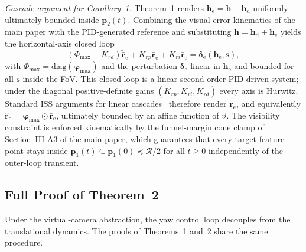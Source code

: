 \documentclass[10pt,journal]{IEEEtran}
\begin{document}
\textit{Cascade argument for Corollary~1.} Theorem~1 renders $\boldsymbol{h}_\text{e}=\boldsymbol{h}-\boldsymbol{h}_\text{d}$ uniformly ultimately bounded inside $\boldsymbol{p}_2(t)$. Combining the visual error kinematics of the main paper with the PID-generated reference and substituting $\boldsymbol{h}=\boldsymbol{h}_\text{d}+\boldsymbol{h}_\text{e}$ yields the horizontal-axis closed loop
\begin{equation*}
    (\Phi_\text{max}+K_{rd})\ddot{\bar{\boldsymbol{r}}}_\text{e} + K_{rp}\dot{\bar{\boldsymbol{r}}}_\text{e} + K_{ri}\bar{\boldsymbol{r}}_\text{e} = \boldsymbol{\delta}_\text{e}(\boldsymbol{h}_\text{e},\boldsymbol{s}),
\end{equation*}
with $\Phi_\text{max}=\text{diag}(\boldsymbol{\varphi}_\text{max})$ and the perturbation $\boldsymbol{\delta}_\text{e}$ linear in $\boldsymbol{h}_\text{e}$ and bounded for all $\boldsymbol{s}$ inside the FoV. This closed loop is a linear second-order PID-driven system; under the diagonal positive-definite gains $(K_{rp},K_{ri},K_{rd})$ every axis is Hurwitz. Standard ISS arguments for linear cascades~\cite{khalil2002} therefore render $\bar{\boldsymbol{r}}_\text{e}$, and equivalently $\hat{\boldsymbol{r}}_\text{e}=\boldsymbol{\varphi}_\text{max}\odot\bar{\boldsymbol{r}}_\text{e}$, ultimately bounded by an affine function of $\vartheta$. The visibility constraint is enforced kinematically by the funnel-margin cone clamp of Section~III-A3 of the main paper, which guarantees that every target feature point stays inside $\boldsymbol{p}_1(t)\subseteq\boldsymbol{p}_1(0)\preceq\mathcal{R}/2$ for all $t\ge 0$ independently of the outer-loop transient.

\subsection{Full Proof of Theorem~2}
\label{sup:theorem2_proof}
Under the virtual-camera abstraction, the yaw control loop decouples from the translational dynamics. The proofs of Theorems~1 and~2 share the same procedure.
\end{document}
